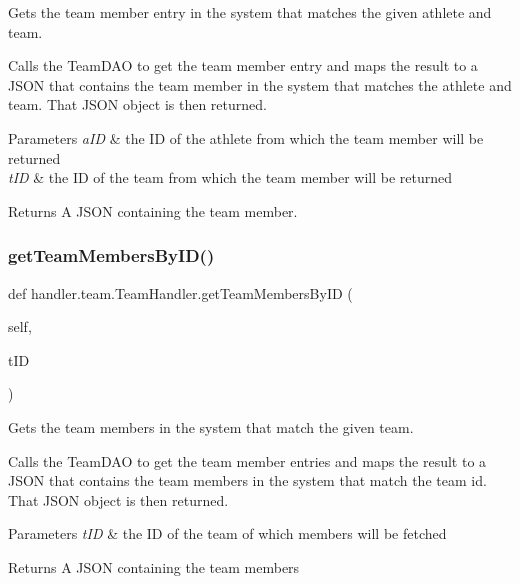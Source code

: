Gets the team member entry in the system that matches the given athlete and team. 

Calls the Team\+D\+AO to get the team member entry and maps the result to a J\+S\+ON that contains the team member in the system that matches the athlete and team. That J\+S\+ON object is then returned.


\begin{DoxyParams}{Parameters}
{\em a\+ID} & the ID of the athlete from which the team member will be returned \\
\hline
{\em t\+ID} & the ID of the team from which the team member will be returned\\
\hline
\end{DoxyParams}
\begin{DoxyReturn}{Returns}
A J\+S\+ON containing the team member. 
\end{DoxyReturn}
\mbox{\label{classhandler_1_1team_1_1_team_handler_a01c7ec029ad084fb936ef9c90ef3a1c0}} 
\subsubsection{\texorpdfstring{get\+Team\+Members\+By\+I\+D()}{getTeamMembersByID()}}
{\footnotesize\ttfamily def handler.\+team.\+Team\+Handler.\+get\+Team\+Members\+By\+ID (\begin{DoxyParamCaption}\item[{}]{self,  }\item[{}]{t\+ID }\end{DoxyParamCaption})}



Gets the team members in the system that match the given team. 

Calls the Team\+D\+AO to get the team member entries and maps the result to a J\+S\+ON that contains the team members in the system that match the team id. That J\+S\+ON object is then returned.


\begin{DoxyParams}{Parameters}
{\em t\+ID} & the ID of the team of which members will be fetched\\
\hline
\end{DoxyParams}
\begin{DoxyReturn}{Returns}
A J\+S\+ON containing the team members 
\end{DoxyReturn}
\mbox{\label{classhandler_1_1team_1_1_team_handler_aeb227f1fec1cfad96ce56cf7de054552}} 
